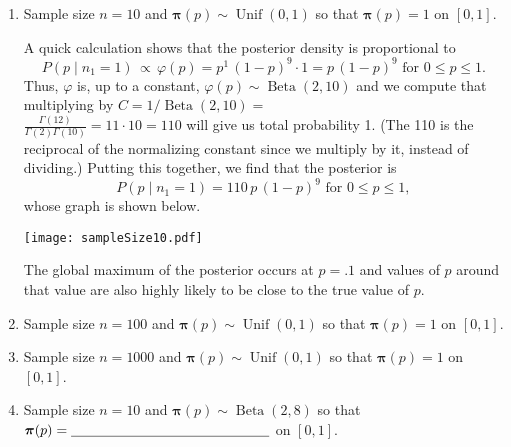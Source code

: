 \documentclass{report}
\newcommand\dsp{\displaystyle}
\newcommand\Beta{\operatorname{Beta}}
\newcommand\Unif{\operatorname{Unif}}
\begin{document}
\begin{enumerate}

\item Sample size $n = 10$ and $\boldsymbol{\pi}(p) \sim \Unif(0,1)$ so that $\boldsymbol{\pi}(p) = 1$ on $[0,1]$.

\smallskip

A quick calculation shows that the posterior density is proportional to
$$
P( p \mid n_1 = 1) \, \propto \, \varphi(p) = p^1\, (1-p)^{9} \cdot 1 = p \, (1-p)^{9} \text{ for } 0 \le p \le 1.
$$
Thus, $\varphi$ is, up to a constant, $\varphi(p) \sim \Beta(2,10)$ and we compute that multiplying by 
$C = 1 / \Beta(2,10) = $\\
$\dsp \frac{\Gamma(12)}{\Gamma(2) \Gamma(10)} = 11 \cdot 10 = 110$ will give us total probability 1.
(The 110 is the reciprocal of the normalizing constant since we multiply by it, instead of dividing.)
Putting this together, we find that the posterior is
$$
P( p \mid n_1 = 1) = 110 \, p \, (1-p)^{9} \text{ for } 0 \le p \le 1,
$$
whose graph is shown below.  

\begin{minipage}{7cm}
\texttt{[image: sampleSize10.pdf]}
\end{minipage}
%
\begin{minipage}{7cm}
The global maximum of the posterior occurs at $p= .1$ and values of $p$ around
that value are also highly likely to be close to the true value of $p$.
\end{minipage}


\item Sample size $n = 100$ and $\boldsymbol{\pi}(p) \sim \Unif(0,1)$ so that $\boldsymbol{\pi}(p) = 1$ on $[0,1]$.

\smallskip


\item Sample size $n = 1000$ and $\boldsymbol{\pi}(p) \sim \Unif(0,1)$ so that $\boldsymbol{\pi}(p) = 1$ on $[0,1]$.

\smallskip



\item Sample size $n = 10$ and $\boldsymbol{\pi}(p) \sim \Beta(2,8)$ so that $\boldsymbol{\pi}(p) = \underline{\hskip 5cm}$ on $[0,1]$.

\smallskip


\end{enumerate}
\end{document}
